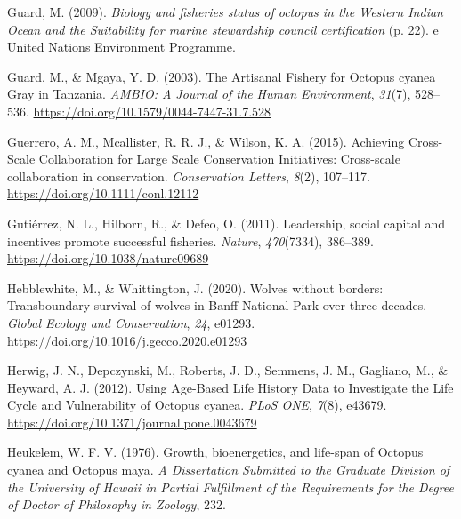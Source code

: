 \documentclass[
]{article}
\newlength{\cslhangindent}
\newlength{\cslentryspacingunit} %
\newenvironment{CSLReferences}[2] %
 {%
  \setlength{\parindent}{0pt}
  \ifodd #1
  \let\oldpar\par
  \def\par{\hangindent=\cslhangindent\oldpar}
  \fi
  \setlength{\parskip}{#2\cslentryspacingunit}
 }%
 {}
\begin{document}
\begin{CSLReferences}{1}{0}
\leavevmode{}%
Guard, M. (2009). \emph{Biology and fisheries status of octopus in the {Western} {Indian} {Ocean} and the {Suitability} for marine stewardship council certification} (p. 22). e United Nations Environment Programme.

\leavevmode{}%
Guard, M., \& Mgaya, Y. D. (2003). The {Artisanal} {Fishery} for {Octopus} cyanea {Gray} in {Tanzania}. \emph{AMBIO: A Journal of the Human Environment}, \emph{31}(7), 528--536. \url{https://doi.org/10.1579/0044-7447-31.7.528}

\leavevmode{}%
Guerrero, A. M., Mcallister, R. R. J., \& Wilson, K. A. (2015). Achieving {Cross}-{Scale} {Collaboration} for {Large} {Scale} {Conservation} {Initiatives}: {Cross}-scale collaboration in conservation. \emph{Conservation Letters}, \emph{8}(2), 107--117. \url{https://doi.org/10.1111/conl.12112}

\leavevmode{}%
Gutiérrez, N. L., Hilborn, R., \& Defeo, O. (2011). Leadership, social capital and incentives promote successful fisheries. \emph{Nature}, \emph{470}(7334), 386--389. \url{https://doi.org/10.1038/nature09689}

\leavevmode{}%
Hebblewhite, M., \& Whittington, J. (2020). Wolves without borders: {Transboundary} survival of wolves in {Banff} {National} {Park} over three decades. \emph{Global Ecology and Conservation}, \emph{24}, e01293. \url{https://doi.org/10.1016/j.gecco.2020.e01293}

\leavevmode{}%
Herwig, J. N., Depczynski, M., Roberts, J. D., Semmens, J. M., Gagliano, M., \& Heyward, A. J. (2012). Using {Age}-{Based} {Life} {History} {Data} to {Investigate} the {Life} {Cycle} and {Vulnerability} of {Octopus} cyanea. \emph{PLoS ONE}, \emph{7}(8), e43679. \url{https://doi.org/10.1371/journal.pone.0043679}

\leavevmode{}%
Heukelem, W. F. V. (1976). Growth, bioenergetics, and life-span of {Octopus} cyanea and {Octopus} maya. \emph{A Dissertation Submitted to the Graduate Division of the University of Hawaii in Partial Fulfillment of the Requirements for the Degree of Doctor of Philosophy in Zoology}, 232.


\end{CSLReferences}
\end{document}

